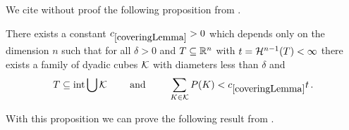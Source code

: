 We cite without proof the following proposition from \cite[Lemma 1.3.2]{Pfe2001}.
\begin{proposition}\label{pr:coveringLemma}
There exists a constant $\useconstant{coveringLemma}>0$ which depends only on the dimension $n$ such that for all $\delta>0$ and $T\subseteq\mathbb{R}^n$ with $t=\mathcal{H}^{n-1}(T)<\infty$  there exists a family of dyadic cubes $\mathcal{K}$ with diameters less than $\delta$ and
\begin{align*}
	T\subseteq\interior\bigcup\cK \qquad\text{ and }\qquad\sum_{K\in\cK}P(K)<\useconstant{coveringLemma} t\,.
\end{align*}
\end{proposition}

\noindent With this proposition we can prove the following result from \cite[Lemma 2.6.4]{Pfe2001}.

